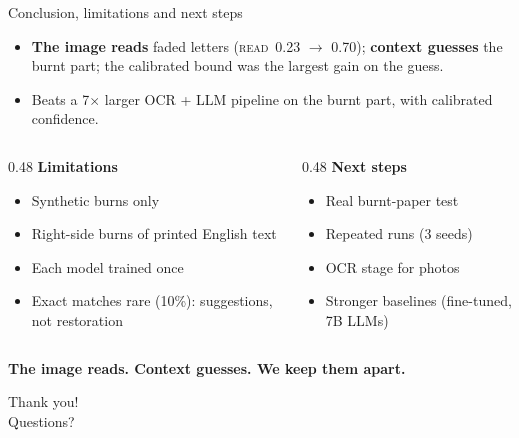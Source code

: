 \documentclass[aspectratio=169,11pt]{beamer}
\newcommand{\READ}{\textsc{read}}
\begin{document}
\begin{frame}{Conclusion, limitations and next steps}
\footnotesize
\begin{itemize}
\item \textbf{The image reads} faded letters (\READ\ 0.23 $\rightarrow$ 0.70); \textbf{context
guesses} the burnt part; the calibrated bound was the largest gain on the guess.
\item Beats a 7$\times$ larger OCR + LLM pipeline on the burnt part, with calibrated confidence.
\end{itemize}
\begin{columns}[T]
\begin{column}{0.48\textwidth}
\textbf{Limitations}
\begin{itemize}
\item Synthetic burns only
\item Right-side burns of printed English text
\item Each model trained once
\item Exact matches rare (10\%): suggestions, not restoration
\end{itemize}
\end{column}
\begin{column}{0.48\textwidth}
\textbf{Next steps}
\begin{itemize}
\item Real burnt-paper test
\item Repeated runs (3 seeds)
\item OCR stage for photos
\item Stronger baselines (fine-tuned, 7B LLMs)
\end{itemize}
\end{column}
\end{columns}

\vspace{0.5em}
\centering
\alert{\textbf{The image reads. Context guesses. We keep them apart.}}
\end{frame}

\begin{frame}[standout]
Thank you!\\[0.5em]
Questions?
\end{frame}
\end{document}
